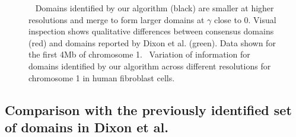 \documentclass[12pt]{cmuthesis}
\begin{document}
  \begin{figure}[t]
    \begin{center}
    \end{center}
    \caption{~ Domains identified by our algorithm (black) are smaller at higher resolutions and merge to form larger domains at $\gamma$ close to 0. Visual inspection shows qualitative differences between consensus domains (red) and domains reported by Dixon et al. (green). Data shown for the first 4Mb of chromosome 1.~ Variation of information for domains identified by our algorithm across different resolutions for chromosome 1 in human fibroblast cells.}
    \label{fig:domains_line}
  \end{figure}


  \subsection{Comparison with the previously identified set of domains in Dixon et al.}
\end{document}
